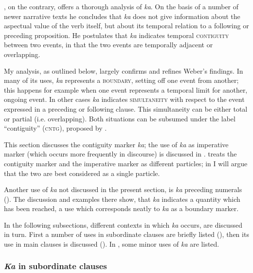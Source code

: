 \citet[33]{WeberR2003}, on the contrary, offers a thorough analysis of \textit{ka}. On the basis of a number of newer narrative texts he concludes that \textit{ka} does not give information about the aspectual value of the verb itself, but about its temporal relation to a following or preceding proposition. He postulates that \textit{ka} indicates temporal \textsc{contiguity} between two events, in that the two events are temporally adjacent or overlapping. 

My analysis, as outlined below, largely confirms and refines Weber’s findings. In many of its uses, \textit{ka} represents a \textsc{boundary}, setting off one event from another; this happens for example when one event represents a temporal limit for another, ongoing event. In other cases \textit{ka} indicates \textsc{simultaneity} with respect to the event expressed in a preceding or following clause. This simultaneity can be either total or partial (i.e. overlapping). Both situations can be subsumed under the label “contiguity” (\textsc{cntg}), proposed by \citet{WeberR2003}. 

This section discusses the contiguity marker \textit{ka}; the use of \textit{ka} as imperative marker (which occurs more frequently in discourse) is discussed in . \citet{WeberR2003} treats the contiguity marker and the imperative marker as different particles; in  I will argue that the two are best considered as a single particle.

Another use of \textit{ka} not discussed in the present section, is \textit{ka} preceding numerals (). The discussion and examples there show, that \textit{ka} indicates a quantity which has been reached, a use which corresponds neatly to \textit{ka} as a boundary marker. 

In the following subsections, different contexts in which \textit{ka} occurs, are discussed in turn. First a number of uses in subordinate clauses are briefly listed (), then its use in main clauses is discussed (). In , some minor uses of \textit{ka} are listed.

\subsubsection{\textit{Ka} in subordinate clauses}\label{sec:7.2.6.2}

